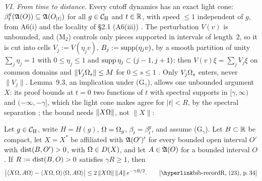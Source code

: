 \emph{VI. From time to distance.} Every cutoff dynamics has an exact light cone:
$\beta^g_t(\mathfrak{A}(O))\subseteq\mathfrak{A}(O_{|t|})$ for all $g\in\mathcal{C}_{\mathrm H}$ and $t\in\mathbb{R}$, with speed
$\le1$ independent of $g$, from A6(i) and the locality of \S2.1 (A6(iii))
. The perturbation
$V(v)$ is unbounded, and (M$_2$) controls only pieces supported in intervals of length~$2$, so it is cut into cells
$V_j:=V(\eta_jv)$, $B_j:=\operatorname{supp}(\eta_jv)$, by a smooth partition of unity
$\sum_j\eta_j=1$ with $0\le\eta_j\le1$ and $\operatorname{supp}\eta_j\subset(j-1,j+1)$: then
$V(v)\xi=\sum_jV_j\xi$ on common domains and $\|V_j\Omega_s\|\le M$ for $0\le s\le1$
.
Only $V_j\Omega_s$ enters, never $\|V_j\|$. Lemma~9.3, an implication under (G$_\gamma$),
allows one unbounded argument $X$: its proof bounds at
$t=0$ two functions of $t$ with spectral supports in $[\gamma,\infty)$ and
$(-\infty,-\gamma]$, which the light cone makes agree for $|t|<R$, by the spectral
separation ; the bound needs $\|X\Omega\|$, not $\|X\|$:
\begin{checkpoint}
Let $g\in\mathcal{C}_{\mathrm H}$, write $H=H(g)$, $\Omega=\Omega_g$, $\beta_t=\beta^g_t$, and assume
(G$_\gamma$). Let $B\subset\mathbb{R}$ be compact, let $X=X^*$ be affiliated with $\mathfrak{A}(O')'$ for
every bounded open interval $O'$ with $\operatorname{dist}(B,O')>0$, with $\Omega\in D(X)$, and let
$A\in\mathfrak{A}(O)$ for a bounded interval $O$. If $R:=\operatorname{dist}(B,O)>0$ satisfies $\gamma R\ge1$, then
\begin{equation*}
 \bigl|\ip{X\Om}{A\Om}-\ip{X\Om}{\Om}\ip{\Om}{A\Om}\bigr|
 \le2\,\|X\Om\|\,\|A\|\,e^{-\gamma R/2} .
 \tag*{\rec{(23)}{34}}
\end{equation*}
\end{checkpoint}

